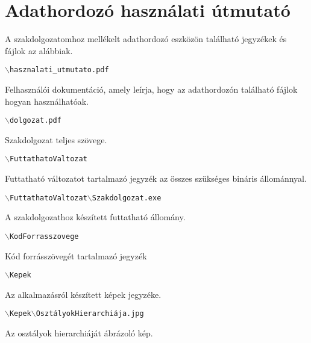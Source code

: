 \chapter*{Adathordozó használati útmutató}



\noindent A szakdolgozatomhoz mellékelt adathordozó eszközön található jegyzékek és fájlok az alábbiak.

\bigskip

\noindent \texttt{$\backslash$hasznalati\_utmutato.pdf}

\medskip

Felhasználói dokumentáció, amely leírja, hogy az adathordozón található fájlok hogyan használhatóak.

\bigskip

\noindent \texttt{$\backslash$dolgozat.pdf}

\medskip

Szakdolgozat teljes szövege.

\bigskip

\noindent \texttt{$\backslash$FuttathatoValtozat}

\medskip

Futtatható változatot tartalmazó jegyzék az összes szükséges bináris állománnyal.

\bigskip

\noindent \texttt{$\backslash$FuttathatoValtozat$\backslash$Szakdolgozat.exe}

\medskip

A szakdolgozathoz készített futtatható állomány.

\bigskip

\noindent \texttt{$\backslash$KodForrasszovege}

\medskip

Kód forrásszövegét tartalmazó jegyzék

\bigskip

\noindent \texttt{$\backslash$Kepek}

\medskip

Az alkalmazásról készített képek jegyzéke.

\bigskip

\noindent \texttt{$\backslash$Kepek$\backslash$OsztályokHierarchiája.jpg}

\medskip

Az osztályok hierarchiáját ábrázoló kép.
